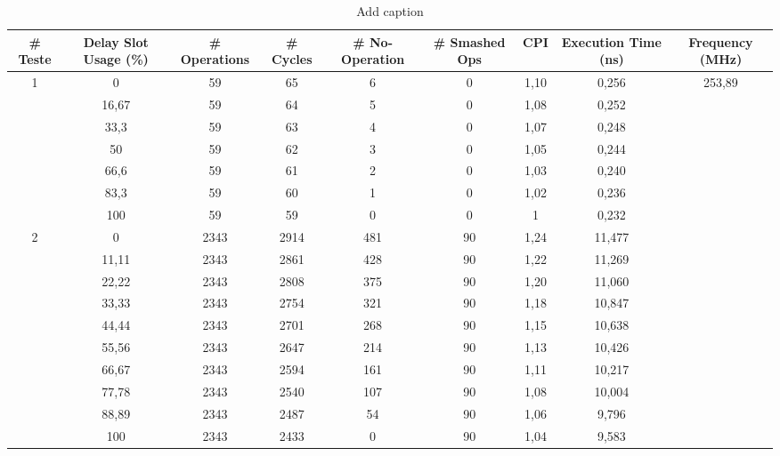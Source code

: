 \begin{adjustbox}{angle=90}
	\begin{table}[htbp]
	  \centering
	  \caption{Add caption}
	    \begin{tabular}{ccccccccc}
	    \toprule
	    \textbf{\# Teste} & \textbf{Delay Slot Usage (\%)} & \textbf{\# Operations} & \textbf{\# Cycles} & \textbf{\# No-Operation} & \textbf{\# Smashed Ops} & \textbf{CPI} & \textbf{Execution Time (ns)} & \textbf{Frequency (MHz)} \\
	    \midrule
	    \multirow{7}[14]{*}{1} & 0     & 59    & 65    & 6     & 0     & 1,10  & 0,256 & \multirow{24}[48]{*}{253,89} \\
	          & 16,67 & 59    & 64    & 5     & 0     & 1,08  & 0,252 &  \\
	          & 33,3  & 59    & 63    & 4     & 0     & 1,07  & 0,248 &  \\
	          & 50    & 59    & 62    & 3     & 0     & 1,05  & 0,244 &  \\
	          & 66,6  & 59    & 61    & 2     & 0     & 1,03  & 0,240 &  \\
	          & 83,3  & 59    & 60    & 1     & 0     & 1,02  & 0,236 &  \\
	          & 100   & 59    & 59    & 0     & 0     & 1     & 0,232 &  \\
	    \midrule
	    \multirow{10}[20]{*}{2} & 0     & 2343  & 2914  & 481   & 90    & 1,24  & 11,477 &  \\
	          & 11,11 & 2343  & 2861  & 428   & 90    & 1,22  & 11,269 &  \\
	          & 22,22 & 2343  & 2808  & 375   & 90    & 1,20  & 11,060 &  \\
	          & 33,33 & 2343  & 2754  & 321   & 90    & 1,18  & 10,847 &  \\
	          & 44,44 & 2343  & 2701  & 268   & 90    & 1,15  & 10,638 &  \\
	          & 55,56 & 2343  & 2647  & 214   & 90    & 1,13  & 10,426 &  \\
	          & 66,67 & 2343  & 2594  & 161   & 90    & 1,11  & 10,217 &  \\
	          & 77,78 & 2343  & 2540  & 107   & 90    & 1,08  & 10,004 &  \\
	          & 88,89 & 2343  & 2487  & 54    & 90    & 1,06  & 9,796 &  \\
	          & 100   & 2343  & 2433  & 0     & 90    & 1,04  & 9,583 &  \\
	    \midrule

\end{tabular}
\end{table}
\end{adjustbox}
